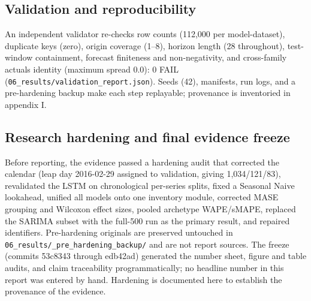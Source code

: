 \subsection{Validation and reproducibility}
\label{sec:validation}
An independent validator re-checks row counts (112,000 per model-dataset),
duplicate keys (zero), origin coverage (1--8), horizon length (28 throughout),
test-window containment, forecast finiteness and non-negativity, and
cross-family actuals identity (maximum spread 0.0): 0 FAIL
(\texttt{06\_results/validation\_report.json}). Seeds (42), manifests, run
logs, and a pre-hardening backup make each step replayable; provenance is
inventoried in appendix I.

\subsection{Research hardening and final evidence freeze}
\label{sec:hardening}
Before reporting, the evidence passed a hardening audit that corrected the
calendar (leap day 2016-02-29 assigned to validation, giving 1,034/121/83),
revalidated the LSTM on chronological per-series splits, fixed a Seasonal
Naive lookahead, unified all models onto one inventory module, corrected MASE
grouping and Wilcoxon effect sizes, pooled archetype WAPE/sMAPE, replaced the
SARIMA subset with the full-500 run as the primary result, and repaired
identifiers. Pre-hardening originals are preserved untouched in
\texttt{06\_results/\_pre\_hardening\_backup/} and are not report sources.
The freeze (commits 53c8343 through edb42ad) generated the number sheet,
figure and table audits, and claim traceability programmatically; no headline
number in this report was entered by hand. Hardening is documented here to
establish the provenance of the evidence.
